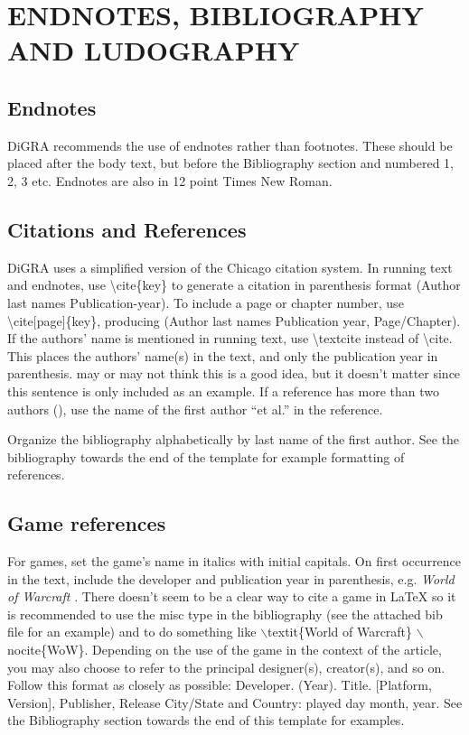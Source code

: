\documentclass[11pt]{article}
\let\originalcite\cite
\renewcommand*{\cite}[1]{(\originalcite{#1})}
\begin{document}
\section*{ENDNOTES, BIBLIOGRAPHY AND LUDOGRAPHY}
\subsection*{Endnotes}
DiGRA recommends the use of endnotes rather than footnotes. These should be placed
after the body text, but before the Bibliography section and numbered 1, 2, 3 etc.
Endnotes are also in 12 point Times New Roman.

\subsection*{Citations and References}
DiGRA uses a simplified version of the Chicago citation system. In running text and
endnotes, use \textbackslash cite\{key\} to generate a citation in parenthesis format (Author last names Publication-year).
To include a page or chapter number, use \textbackslash cite[page]\{key\}, producing
(Author last names Publication year, Page/Chapter). If the
authors’ name is mentioned in running text, use \textbackslash textcite instead of \textbackslash cite.
This places the authors' name(s) in the text, and only the publication year in parenthesis.
\textcite[453]{ethics} may or may not think this is a good idea, but it doesn’t matter since
this sentence is only included as an example. If a reference has more than two authors
\cite{schwartz.1995}, use the name of the first author ``et al.'' in the reference. 

Organize the bibliography alphabetically by last name of the first author. See the
bibliography towards the end of the template for example formatting of references.
\subsection*{Game references}
For games, set the game’s name in italics with initial capitals. On first occurrence in the
text, include the developer and publication year in parenthesis, e.g. \textit{World of Warcraft}
\nocite{WoW}. There doesn't seem to be a clear way to cite a game in LaTeX so it is recommended to use the misc type in the bibliography (see the attached bib file for an example) and to do something like $\backslash$textit\{World of Warcraft\} $\backslash$nocite\{WoW\}.  Depending on the use of the game in the context of the article, you may
also choose to refer to the principal designer(s), creator(s), and so on. Follow this format
as closely as possible:
Developer. (Year). Title. [Platform, Version], Publisher, Release City/State and Country:
played day month, year.
See the Bibliography section towards the end of this template for examples.
\end{document}
